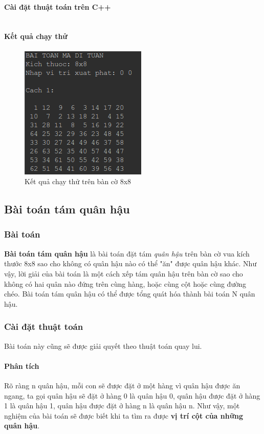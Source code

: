 \documentclass[8pt, a4paper]{article}
\newcommand{\mnt}[1]{\inputminted[frame=single, linenos=true, tabsize=4]{c++}{#1}}
\begin{document}
\paragraph{Cài đặt thuật toán trên C++}
\mnt{src/knight.cpp}
\paragraph{Kết quả chạy thử}
\begin{figure}[htp]
\centering
\includegraphics[scale=0.50]{img/knight1.png}
\caption{Kết quả chạy thử trên bàn cờ 8x8}
\label{}
\end{figure}

\subsection{Bài toán tám quân hậu}

\subsubsection{Bài toán}
\textbf{Bài toán tám quân hậu} là bài toán đặt tám \emph{quân hậu} trên bàn cờ vua kích thước 8x8 sao cho không có quân hậu nào có thể "ăn" được quân hậu khác. Như vậy, lời giải của bài toán là một cách xếp tám quân hậu trên bàn cờ sao cho không có hai quân nào đứng trên cùng hàng, hoặc cùng cột hoặc cùng đường chéo. Bài toán tám quân hậu có thể được tổng quát hóa thành bài toán N quân hậu.

\subsubsection{Cài đặt thuật toán}
Bài toán này cũng sẽ được giải quyết theo thuật toán quay lui. 


\paragraph{Phân tích}
Rõ ràng n quân hậu, mỗi con sẽ được đặt ở một hàng vì quân hậu được ăn ngang, ta gọi quân hậu sẽ đặt ở hàng 0 là quân hậu 0, quân hậu được đặt ở hàng 1 là quân hậu 1, quân hậu được đặt ở hàng n là quân hậu n. Như vậy, một nghiệm của bài toán sẽ được biết khi ta tìm ra được \textbf{vị trí cột của những quân hậu}.
\end{document}
